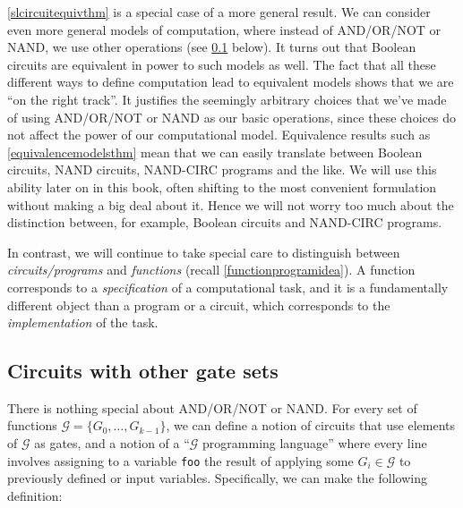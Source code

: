 \cref{slcircuitequivthm} is a special case of a more general result. We
can consider even more general models of computation, where instead of
AND/OR/NOT or NAND, we use other operations (see \cref{othergatessec}
below). It turns out that Boolean circuits are equivalent in power to
such models as well. The fact that all these different ways to define
computation lead to equivalent models shows that we are ``on the right
track''. It justifies the seemingly arbitrary choices that we've made of
using AND/OR/NOT or NAND as our basic operations, since these choices do
not affect the power of our computational model. Equivalence results
such as \cref{equivalencemodelsthm} mean that we can easily translate
between Boolean circuits, NAND circuits, NAND-CIRC programs and the
like. We will use this ability later on in this book, often shifting to
the most convenient formulation without making a big deal about it.
Hence we will not worry too much about the distinction between, for
example, Boolean circuits and NAND-CIRC programs.

In contrast, we will continue to take special care to distinguish
between \emph{circuits/programs} and \emph{functions} (recall
\cref{functionprogramidea}). A function corresponds to a
\emph{specification} of a computational task, and it is a fundamentally
different object than a program or a circuit, which corresponds to the
\emph{implementation} of the task.

\subsection{Circuits with other gate sets}\label{othergatessec}

There is nothing special about AND/OR/NOT or NAND. For every set of
functions \(\mathcal{G} = \{ G_0,\ldots,G_{k-1} \}\), we can define a
notion of circuits that use elements of \(\mathcal{G}\) as gates, and a
notion of a ``\(\mathcal{G}\) programming language'' where every line
involves assigning to a variable \texttt{foo} the result of applying
some \(G_i \in \mathcal{G}\) to previously defined or input variables.
Specifically, we can make the following definition:

\hypertarget{genstraight-lineprogs}{}

